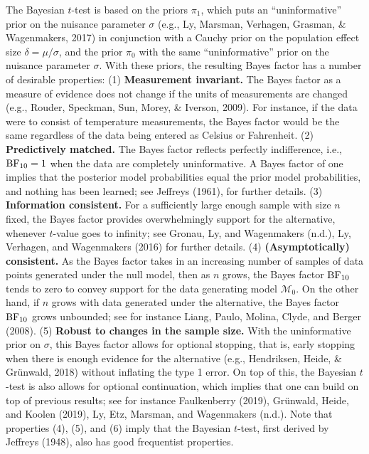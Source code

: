 \documentclass[english,,doc,floatsintext]{apa6}
\begin{document}
The Bayesian \(t\)-test is based on the priors \(\pi_{1}\), which puts an \enquote{uninformative} prior on the nuisance parameter \(\sigma\) (e.g., Ly, Marsman, Verhagen, Grasman, \& Wagenmakers, 2017) in conjunction with a Cauchy prior on the population effect size \(\delta = \mu / \sigma\), and the prior \(\pi_{0}\) with the same \enquote{uninformative} prior on the nuisance parameter \(\sigma\). With these priors, the resulting Bayes factor has a number of desirable properties: (1) \textbf{Measurement invariant.} The Bayes factor as a measure of evidence does not change if the units of measurements are changed (e.g., Rouder, Speckman, Sun, Morey, \& Iverson, 2009). For instance, if the data were to consist of temperature measurements, the Bayes factor would be the same regardless of the data being entered as Celsius or Fahrenheit. (2) \textbf{Predictively matched.} The Bayes factor reflects perfectly indifference, i.e., \(\textnormal{BF}_{10}=1\) when the data are completely uninformative. A Bayes factor of one implies that the posterior model probabilities equal the prior model probabilities, and nothing has been learned; see Jeffreys (1961), for further details. (3) \textbf{Information consistent.} For a sufficiently large enough sample with size \(n\) fixed, the Bayes factor provides overwhelmingly support for the alternative, whenever \(t\)-value goes to infinity; see Gronau, Ly, and Wagenmakers (n.d.), Ly, Verhagen, and Wagenmakers (2016) for further details. (4) \textbf{(Asymptotically) consistent.} As the Bayes factor takes in an increasing number of samples of data points generated under the null model, then as \(n\) grows, the Bayes factor \(\textnormal{BF}_{10}\) tends to zero to convey support for the data generating model \(\mathcal{M}_{0}\). On the other hand, if \(n\) grows with data generated under the alternative, the Bayes factor \(\textnormal{BF}_{10}\) grows unbounded; see for instance Liang, Paulo, Molina, Clyde, and Berger (2008). (5) \textbf{Robust to changes in the sample size.} With the uninformative prior on \(\sigma\), this Bayes factor allows for optional stopping, that is, early stopping when there is enough evidence for the alternative (e.g., Hendriksen, Heide, \& Grünwald, 2018) without inflating the type 1 error. On top of this, the Bayesian \(t\)-test is also allows for optional continuation, which implies that one can build on top of previous results; see for instance Faulkenberry (2019), Grünwald, Heide, and Koolen (2019), Ly, Etz, Marsman, and Wagenmakers (n.d.). Note that properties (4), (5), and (6) imply that the Bayesian \(t\)-test, first derived by Jeffreys (1948), also has good frequentist properties.
\end{document}
